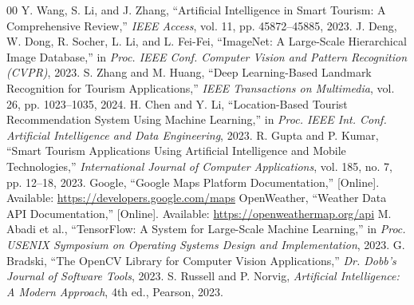 \documentclass[conference]{IEEEtran}
\begin{document}
\begin{thebibliography}{00}
 Y. Wang, S. Li, and J. Zhang, ``Artificial Intelligence in Smart Tourism: A Comprehensive Review,'' \textit{IEEE Access}, vol. 11, pp. 45872--45885, 2023.
 J. Deng, W. Dong, R. Socher, L. Li, and L. Fei-Fei, ``ImageNet: A Large-Scale Hierarchical Image Database,'' in \textit{Proc. IEEE Conf. Computer Vision and Pattern Recognition (CVPR)}, 2023.
 S. Zhang and M. Huang, ``Deep Learning-Based Landmark Recognition for Tourism Applications,'' \textit{IEEE Transactions on Multimedia}, vol. 26, pp. 1023--1035, 2024.
 H. Chen and Y. Li, ``Location-Based Tourist Recommendation System Using Machine Learning,'' in \textit{Proc. IEEE Int. Conf. Artificial Intelligence and Data Engineering}, 2023.
 R. Gupta and P. Kumar, ``Smart Tourism Applications Using Artificial Intelligence and Mobile Technologies,'' \textit{International Journal of Computer Applications}, vol. 185, no. 7, pp. 12--18, 2023.
 Google, ``Google Maps Platform Documentation,'' [Online]. Available: \url{https://developers.google.com/maps}
 OpenWeather, ``Weather Data API Documentation,'' [Online]. Available: \url{https://openweathermap.org/api}
 M. Abadi et al., ``TensorFlow: A System for Large-Scale Machine Learning,'' in \textit{Proc. USENIX Symposium on Operating Systems Design and Implementation}, 2023.
 G. Bradski, ``The OpenCV Library for Computer Vision Applications,'' \textit{Dr. Dobb's Journal of Software Tools}, 2023.
 S. Russell and P. Norvig, \textit{Artificial Intelligence: A Modern Approach}, 4th ed., Pearson, 2023.
\end{thebibliography}
\end{document}
